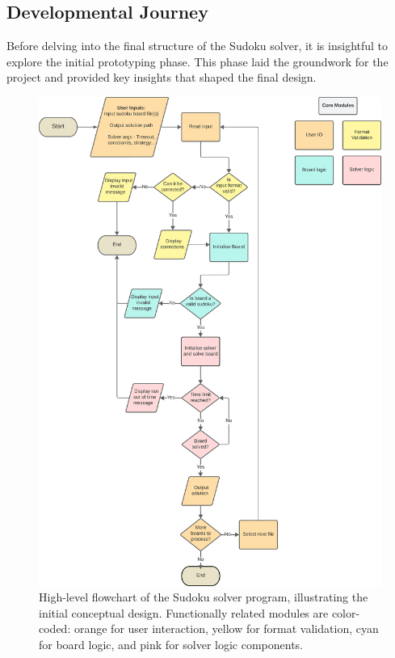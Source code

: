 \documentclass[11pt]{article}
\begin{document}
\subsection{Developmental Journey}
Before delving into the final structure of the Sudoku solver, it is insightful to explore the initial prototyping phase. This phase laid the groundwork for the project and provided key insights that shaped the final design.

\begin{figure}[H]
\centering
\includegraphics[width=1\textwidth]{figs/solver_flowchart.png}
\caption{High-level flowchart of the Sudoku solver program, illustrating the initial conceptual design. Functionally related modules are color-coded: orange for user interaction, yellow for format validation, cyan for board logic, and pink for solver logic components.}


\label{fig:solver_flowchart}
\end{figure}
\end{document}
